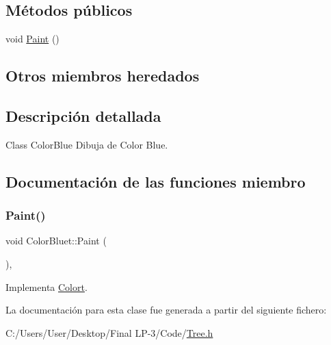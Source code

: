 \subsection*{Métodos públicos}
\begin{DoxyCompactItemize}
\item 
void \mbox{\hyperlink{class_color_bluet_a85a8c029754934fb8012481e5e18cdbd}{Paint}} ()
\end{DoxyCompactItemize}
\subsection*{Otros miembros heredados}


\subsection{Descripción detallada}
Class Color\+Blue Dibuja de Color Blue. 

\subsection{Documentación de las funciones miembro}
\mbox{\label{class_color_bluet_a85a8c029754934fb8012481e5e18cdbd}} 
\subsubsection{\texorpdfstring{Paint()}{Paint()}}
{\footnotesize\ttfamily void Color\+Bluet\+::\+Paint (\begin{DoxyParamCaption}{ }\end{DoxyParamCaption})\hspace{0.3cm}{\ttfamily [inline]}, {\ttfamily [virtual]}}



Implementa \mbox{\hyperlink{class_colort_aee987a82c2c47304d7406816d6ca0da7}{Colort}}.



La documentación para esta clase fue generada a partir del siguiente fichero\+:\begin{DoxyCompactItemize}
\item 
C\+:/\+Users/\+User/\+Desktop/\+Final L\+P-\/3/\+Code/\mbox{\hyperlink{_tree_8h}{Tree.\+h}}\end{DoxyCompactItemize}
